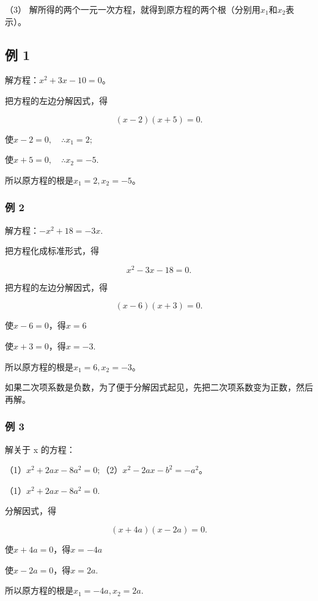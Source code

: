 （3）
解所得的两个一元一次方程，就得到原方程的两个根（分别用\(x_{1}\)和\(x_{2}\)表示）。

\subsection{例 1}

解方程：\(x^{2} + 3x - 10 = 0\)。

 把方程的左边分解因式，得

\[
(x - 2) (x + 5) = 0.
\]

使\(x - 2 = 0, \quad \therefore x_{1} = 2;\)

使\(x + 5 = 0, \quad \therefore x_{2} = -5.\)

所以原方程的根是\(x_{1} = 2, x_{2} = -5\)。

\subsubsection{例 2}

解方程：\(-x^{2}+18=-3x.\)

 把方程化成标准形式，得

\[
x ^ {2} - 3 x - 18 = 0.
\]

把方程的左边分解因式，得

\[
(x - 6) (x + 3) = 0.
\]

使\(x - 6 = 0\)，得\(x = 6\)

使\(x + 3 = 0\)，得\(x = -3.\)

所以原方程的根是\(x_{1} = 6, x_{2} = -3\)。

如果二次项系数是负数，为了便于分解因式起见，先把二次项系数变为正数，然后再解。

\subsubsection{例 3}

解关于 x 的方程：

（1）\(x^{2} + 2ax - 8a^{2} = 0;\)（2）\(x^{2} - 2ax - b^{2} = -a^{2}\)。

 （1）\(x^{2} + 2ax - 8a^{2} = 0.\)

分解因式，得

\[
(x + 4 a) (x - 2 a) = 0.
\]

使\(x + 4a = 0\)，得\(x = -4a\)

使\(x - 2a = 0\)，得\(x = 2a.\)

所以原方程的根是\(x_{1} = -4a, x_{2} = 2a.\)

